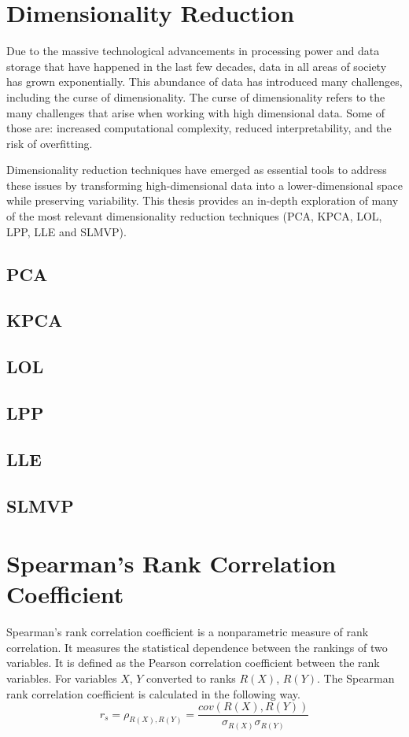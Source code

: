 \section{Dimensionality Reduction}
Due to the massive technological advancements in processing power and data storage that have happened in the last few decades, data in all areas of society has grown exponentially. This abundance of data has introduced many challenges, including the curse of dimensionality. The curse of dimensionality refers to the many challenges that arise when working with high dimensional data. Some of those are: increased computational complexity, reduced interpretability, and the risk of overfitting.

Dimensionality reduction techniques have emerged as essential tools to address these issues by transforming high-dimensional data into a lower-dimensional space while preserving variability. This thesis provides an in-depth exploration of many of the most relevant dimensionality reduction techniques (PCA, KPCA, LOL, LPP, LLE and SLMVP).

\subsection{PCA}


\subsection{KPCA}


\subsection{LOL}


\subsection{LPP}


\subsection{LLE}


\subsection{SLMVP}

\section{Spearman's Rank Correlation Coefficient}
Spearman's rank correlation coefficient is a nonparametric measure of rank correlation. It measures the statistical dependence between the rankings of two variables. It is defined as the Pearson correlation coefficient between the rank variables. For variables $X$, $Y$ converted to ranks $R(X)$, $R(Y)$. The Spearman rank correlation coefficient is calculated in the following way.
\begin{equation}
    r_s = \rho_{R(X), R(Y)} = \frac{cov(R(X),R(Y))}{\sigma_{R(X)} \sigma_{R(Y)}}
\end{equation}


